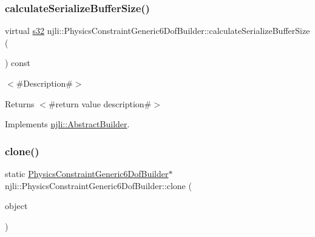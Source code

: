 \mbox{\label{classnjli_1_1_physics_constraint_generic6_dof_builder_a03d46bdf8bd1ed3f9788a031d98ee651}} 
\subsubsection{\texorpdfstring{calculate\+Serialize\+Buffer\+Size()}{calculateSerializeBufferSize()}}
{\footnotesize\ttfamily virtual \mbox{\hyperlink{_util_8h_aa62c75d314a0d1f37f79c4b73b2292e2}{s32}} njli\+::\+Physics\+Constraint\+Generic6\+Dof\+Builder\+::calculate\+Serialize\+Buffer\+Size (\begin{DoxyParamCaption}{ }\end{DoxyParamCaption}) const\hspace{0.3cm}{\ttfamily [virtual]}}

$<$\#\+Description\#$>$

\begin{DoxyReturn}{Returns}
$<$\#return value description\#$>$ 
\end{DoxyReturn}


Implements \mbox{\hyperlink{classnjli_1_1_abstract_builder_aa1d220053e182c37b31b427499c6eacf}{njli\+::\+Abstract\+Builder}}.

\mbox{\label{classnjli_1_1_physics_constraint_generic6_dof_builder_a98be0309bcc91621a6cc38f9ca01b6f7}} 
\subsubsection{\texorpdfstring{clone()}{clone()}}
{\footnotesize\ttfamily static \mbox{\hyperlink{classnjli_1_1_physics_constraint_generic6_dof_builder}{Physics\+Constraint\+Generic6\+Dof\+Builder}}$\ast$ njli\+::\+Physics\+Constraint\+Generic6\+Dof\+Builder\+::clone (\begin{DoxyParamCaption}\item[{const \mbox{\hyperlink{classnjli_1_1_physics_constraint_generic6_dof_builder}{Physics\+Constraint\+Generic6\+Dof\+Builder}} \&}]{object }\end{DoxyParamCaption})\hspace{0.3cm}{\ttfamily [static]}}

